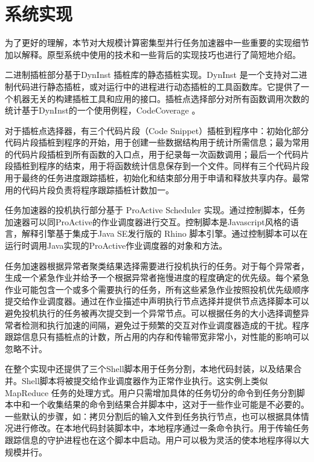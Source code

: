 \section{系统实现}
\label{subsec:no2_impl}
为了更好的理解，本节对大规模计算密集型并行任务加速器中一些重要的实现细节加以解释。原型系统中使用的技术和一些背后的实现技巧也进行了简短地介绍。

二进制插桩部分基于DynInst \cite{Dyninst-Deconstruction} 插桩库的静态插桩实现。DynInst 是一个支持对二进制代码进行静态插桩，或对运行中的进程进行动态插桩的工具函数库。它提供了一个机器无关的构建插桩工具和应用的接口。插桩点选择部分对所有函数调用次数的统计基于DynInst的一个使用例程，CodeCoverage \cite{codecoverage}。
	
对于插桩点选择器，有三个代码片段（Code Snippet）插桩到程序中：初始化部分代码片段插桩到程序的开始，用于创建一些数据结构用于统计所需信息；最为常用的代码片段插桩到所有函数的入口点，用于纪录每一次函数调用；最后一个代码片段插桩到程序的结束，用于将函数统计信息保存到一个文件。同样有三个代码片段用于最终的任务进度跟踪插桩，初始化和结束部分用于申请和释放共享内存。最常用的代码片段负责将程序跟踪插桩计数加一。

任务加速器的投机执行部分基于 ProActive Scheduler \cite{pascheduling} 实现。通过控制脚本，任务加速器可以同ProActive的作业调度器进行交互。控制脚本是Javascript风格的语言，解释引擎基于集成于Java SE发行版的 Rhino \cite{Rhino:2016} 脚本引擎。通过控制脚本可以在运行时调用Java实现的ProActive作业调度器的对象和方法。

任务加速器根据异常者聚类结果选择需要进行投机执行的任务。对于每个异常者，生成一个紧急作业并给予一个根据异常者拖慢进度的程度确定的优先级。每个紧急作业可能包含一个或多个需要执行的任务，所有这些紧急作业按照投机优先级顺序提交给作业调度器。通过在作业描述中声明执行节点选择并提供节点选择脚本可以避免投机执行的任务被再次提交到一个异常节点。可以根据任务的大小选择调整异常者检测和执行加速的间隔，避免过于频繁的交互对作业调度器造成的干扰。程序跟踪信息只有插桩点的计数，所占用的内存和传输带宽非常小，对性能的影响可以忽略不计。

在整个实现中还提供了三个Shell脚本用于任务分割，本地代码封装，以及结果合并。Shell脚本将被提交给作业调度器作为正常作业执行。这实例上类似 MapReduce 任务的处理方式。用户只需增加具体的任务切分的命令到任务分割脚本中和一个收集结果的命令到结果合并脚本中，这对于一些作业可能是不必要的。一些默认的步骤，如：拷贝分割后的输入文件到任务执行节点，也可以根据具体情况进行修改。在本地代码封装脚本中，本地程序通过一条命令执行。用于传输任务跟踪信息的守护进程也在这个脚本中启动。用户可以极为灵活的使本地程序得以大规模并行。

